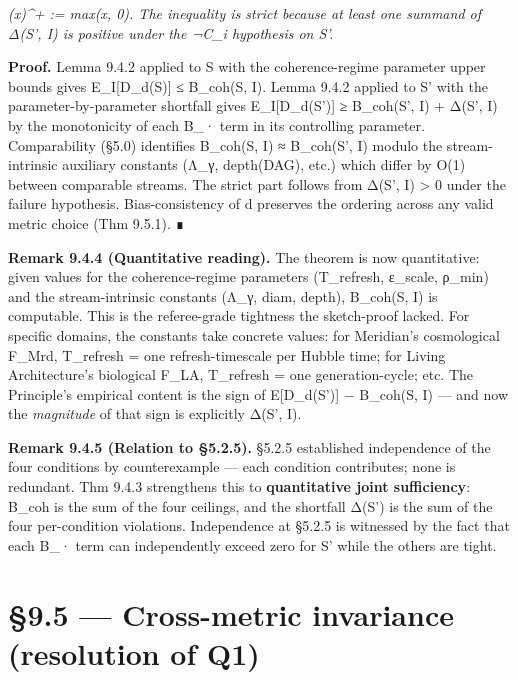 \documentclass[11pt, openany]{book}
\newcommand{\sectionbreak}{\clearpage}
\begin{document}
\textit{(x)\textasciicircum{}+ := max(x, 0). The inequality is strict because at least one summand of Δ(S', I) is positive under the ¬C\_\allowbreak{}i hypothesis on S'.}

\textbf{Proof.} Lemma 9.4.2 applied to S with the coherence-regime parameter upper bounds gives E\_\allowbreak{}I[D\_\allowbreak{}d(S)] ≤ B\_\allowbreak{}coh(S, I). Lemma 9.4.2 applied to S' with the parameter-by-parameter shortfall gives E\_\allowbreak{}I[D\_\allowbreak{}d(S')] ≥ B\_\allowbreak{}coh(S', I) + Δ(S', I) by the monotonicity of each B\_\allowbreak{}· term in its controlling parameter. Comparability (§5.0) identifies B\_\allowbreak{}coh(S, I) ≈ B\_\allowbreak{}coh(S', I) modulo the stream-intrinsic auxiliary constants (Λ\_\allowbreak{}γ, depth(DAG), etc.) which differ by O(1) between comparable streams. The strict part follows from Δ(S', I) > 0 under the failure hypothesis. Bias-consistency of d preserves the ordering across any valid metric choice (Thm 9.5.1). ∎

\textbf{Remark 9.4.4 (Quantitative reading).} The theorem is now quantitative: given values for the coherence-regime parameters (T\_\allowbreak{}refresh, ε\_\allowbreak{}scale, ρ\_\allowbreak{}min) and the stream-intrinsic constants (Λ\_\allowbreak{}γ, diam, depth), B\_\allowbreak{}coh(S, I) is computable. This is the referee-grade tightness the sketch-proof lacked. For specific domains, the constants take concrete values: for Meridian's cosmological F\_\allowbreak{}Mrd, T\_\allowbreak{}refresh = one refresh-timescale per Hubble time; for Living Architecture's biological F\_\allowbreak{}LA, T\_\allowbreak{}refresh = one generation-cycle; etc. The Principle's empirical content is the sign of E[D\_\allowbreak{}d(S')] − B\_\allowbreak{}coh(S, I) --- and now the \textit{magnitude} of that sign is explicitly Δ(S', I).

\textbf{Remark 9.4.5 (Relation to §5.2.5).} §5.2.5 established independence of the four conditions by counterexample --- each condition contributes; none is redundant. Thm 9.4.3 strengthens this to \textbf{quantitative joint sufficiency}: B\_\allowbreak{}coh is the sum of the four ceilings, and the shortfall Δ(S') is the sum of the four per-condition violations. Independence at §5.2.5 is witnessed by the fact that each B\_\allowbreak{}· term can independently exceed zero for S' while the others are tight.

\sectionbreak

\section{§9.5 --- Cross-metric invariance (resolution of Q1)}
\end{document}
